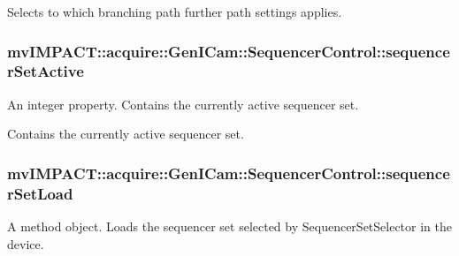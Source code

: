 Selects to which branching path further path settings applies. \hypertarget{classmv_i_m_p_a_c_t_1_1acquire_1_1_gen_i_cam_1_1_sequencer_control_ab7c1aa6c23757b04d16a10d271802cb8}{
\subsubsection[{sequencer\+Set\+Active}]{ mv\+I\+M\+P\+A\+C\+T\+::acquire\+::\+Gen\+I\+Cam\+::\+Sequencer\+Control\+::sequencer\+Set\+Active}}\label{classmv_i_m_p_a_c_t_1_1acquire_1_1_gen_i_cam_1_1_sequencer_control_ab7c1aa6c23757b04d16a10d271802cb8}


An integer property. Contains the currently active sequencer set. 

Contains the currently active sequencer set. \hypertarget{classmv_i_m_p_a_c_t_1_1acquire_1_1_gen_i_cam_1_1_sequencer_control_aa3b1c98fb945874f5399281be7564f26}{
\subsubsection[{sequencer\+Set\+Load}]{ mv\+I\+M\+P\+A\+C\+T\+::acquire\+::\+Gen\+I\+Cam\+::\+Sequencer\+Control\+::sequencer\+Set\+Load}}\label{classmv_i_m_p_a_c_t_1_1acquire_1_1_gen_i_cam_1_1_sequencer_control_aa3b1c98fb945874f5399281be7564f26}


A method object. Loads the sequencer set selected by Sequencer\+Set\+Selector in the device. 

